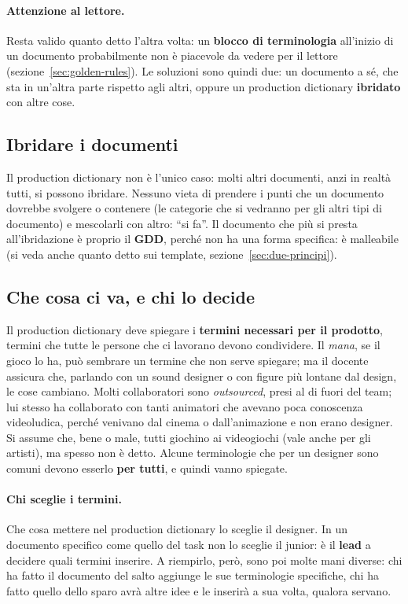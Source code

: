 \paragraph{Attenzione al lettore.} Resta valido quanto detto l'altra volta:
un \textbf{blocco di terminologia} all'inizio di un documento probabilmente
non è piacevole da vedere per il lettore (sezione~\ref{sec:golden-rules}).
Le soluzioni sono quindi due: un documento a sé, che sta in un'altra parte
rispetto agli altri, oppure un production dictionary \textbf{ibridato} con
altre cose.

\subsection{Ibridare i documenti}

Il production dictionary non è l'unico caso: molti altri documenti, anzi in
realtà tutti, si possono ibridare. Nessuno vieta di prendere i punti che un
documento dovrebbe svolgere o contenere (le categorie che si vedranno per gli
altri tipi di documento) e mescolarli con altro: ``si fa''. Il documento che
più si presta all'ibridazione è proprio il \textbf{GDD}, perché non ha una
forma specifica: è malleabile (si veda anche quanto detto sui template,
sezione~\ref{sec:due-principi}).

\subsection{Che cosa ci va, e chi lo decide}

Il production dictionary deve spiegare i \textbf{termini necessari per il
prodotto}, termini che tutte le persone che ci lavorano devono condividere.
Il \emph{mana}, se il gioco lo ha, può sembrare un termine che non serve
spiegare; ma il docente assicura che, parlando con un sound designer o con
figure più lontane dal design, le cose cambiano. Molti collaboratori sono
\emph{outsourced}, presi al di fuori del team; lui stesso ha collaborato con
tanti animatori che avevano poca conoscenza videoludica, perché venivano dal
cinema o dall'animazione e non erano designer. Si assume che, bene o male,
tutti giochino ai videogiochi (vale anche per gli artisti), ma spesso non è
detto. Alcune terminologie che per un designer sono comuni devono esserlo
\textbf{per tutti}, e quindi vanno spiegate.

\paragraph{Chi sceglie i termini.} Che cosa mettere nel production dictionary
lo sceglie il designer. In un documento specifico come quello del task non lo
sceglie il junior: è il \textbf{lead} a decidere quali termini inserire. A
riempirlo, però, sono poi molte mani diverse: chi ha fatto il documento del
salto aggiunge le sue terminologie specifiche, chi ha fatto quello dello
sparo avrà altre idee e le inserirà a sua volta, qualora servano.

